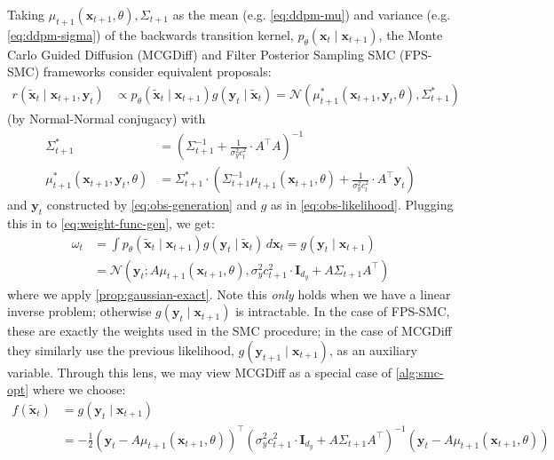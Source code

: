 Taking $\mu_{t+1}(\mathbf{x}_{t+1}, \theta), \Sigma_{t+1}$ as the mean (e.g. \ref{eq:ddpm-mu}) and
variance (e.g. \ref{eq:ddpm-sigma}) of the backwards transition kernel,
$p_\theta(\mathbf{x}_t \mid \mathbf{x}_{t+1})$, the Monte Carlo Guided Diffusion (MCGDiff)
\parencite{cardosoMonteCarloGuided2023} and Filter Posterior Sampling SMC (FPS-SMC)
\parencite{douDiffusionPosteriorSampling2023} frameworks consider equivalent proposals:
\begin{align*}
    r(\tilde{\mathbf{x}}_{t} \mid \mathbf{x}_{t+1}, \mathbf{y}_t) &\propto p_\theta(\tilde{\mathbf{x}}_t \mid \mathbf{x}_{t+1})g(\mathbf{y}_{t} \mid \tilde{\mathbf{x}}_{t})
    = \mathcal{N}(\mu^{*}_{t+1}(\mathbf{x}_{t+1}, \mathbf{y}_t, \theta), \Sigma_{t+1}^{*})
\end{align*}
(by Normal-Normal conjugacy) with
\begin{align*}
    \Sigma_{t+1}^{*} &= \left(\Sigma_{t+1}^{-1} + \frac{1}{\sigma_y^2c_t^2}\cdot A^\top A \right)^{-1} \\
    \mu_{t+1}^{*}(\mathbf{x}_{t+1}, \mathbf{y}_t, \theta) &= \Sigma_{t+1}^{*}\cdot\left(\Sigma_{t+1}^{-1}\mu_{t+1}(\mathbf{x}_{t+1}, \theta) + \frac{1}{\sigma_y^2c_t^2}\cdot A^\top\mathbf{y}_t \right)
\end{align*}
and $\mathbf{y}_t$ constructed by \ref{eq:obs-generation} and $g$ as in \ref{eq:obs-likelihood}.
Plugging this in to \ref{eq:weight-func-gen}, we get:
\begin{align*}
    \omega_t &= \int p_\theta(\tilde{\mathbf{x}}_t \mid \mathbf{x}_{t+1})g(\mathbf{y}_{t} \mid \tilde{\mathbf{x}}_{t})\, d\mathbf{x}_t
    = g(\mathbf{y}_t \mid \mathbf{x}_{t+1}) \\
    &= \mathcal{N}\left(\mathbf{y}_t; A\mu_{t+1}(\mathbf{x}_{t+1}, \theta), \sigma_y^2c_{t+1}^2\cdot\mathbf{I}_{d_y} + A\Sigma_{t+1}A^\top\right)
\end{align*}
where we apply \ref{prop:gaussian-exact}. Note this \emph{only} holds when we have a linear inverse
problem; otherwise $g(\mathbf{y}_t \mid \mathbf{x}_{t+1})$ is intractable. In the case of FPS-SMC,
these are exactly the weights used in the SMC procedure; in the case of MCGDiff they similarly
use the previous likelihood, $g(\mathbf{y}_{t+1} \mid \mathbf{x}_{t+1})$, as an auxiliary variable.
Through this lens, we may view MCGDiff as a special case of \ref{alg:smc-opt} where we choose:
\begin{align*}
    f(\tilde{\mathbf{x}}_t) &= g(\mathbf{y}_t \mid \mathbf{x}_{t+1}) \\
    &= -\frac{1}{2}(\mathbf{y}_t - A\mu_{t+1}(\mathbf{x}_{t+1}, \theta))^\top\left(\sigma_y^2c_{t+1}^2\cdot\mathbf{I}_{d_y} + A\Sigma_{t+1}A^\top\right)^{-1}(\mathbf{y}_t - A\mu_{t+1}(\mathbf{x}_{t+1}, \theta))
\end{align*}
